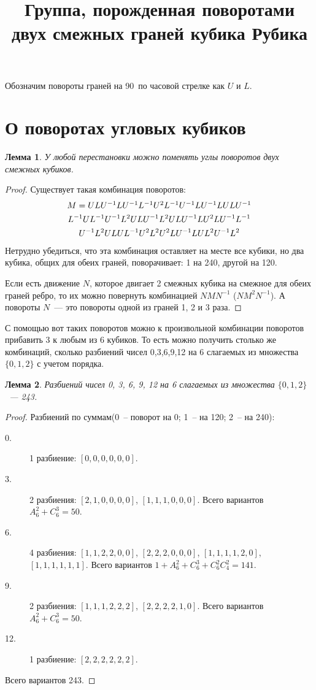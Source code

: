 \documentclass[utf8,a4paper,draft]{article}
\title{Группа, порожденная поворотами двух смежных граней кубика Рубика}
\author{}
\date{}
\newtheorem{lemma_cub1}{Лемма}
\begin{document}
\maketitle
Обозначим повороты граней на 90\textdegree~по часовой стрелке как $U$ и $L$.
\section{О поворотах угловых кубиков}
\begin{lemma_cub1}
У любой перестановки можно поменять углы поворотов двух смежных кубиков.
\end{lemma_cub1}
\begin{proof}
Существует такая комбинация поворотов:
\begin{multline*}
$$
M = ULU^{-1}LU^{-1}L^{-1}U^2L^{-1}U^{-1}LU^{-1}LULU^{-1}       \\
    L^{-1}UL^{-1}U^{-1}L^2ULU^{-1}L^2ULU^{-1}LU^2LU^{-1}L^{-1} \\
    U^{-1}L^2ULUL^{-1}U^2L^2U^2LU^{-1}LUL^2U^{-1}L^2
$$
\end{multline*}
    Нетрудно убедиться, что эта комбинация оставляет на месте все кубики, но
два кубика, общих для обеих граней, поворачивает: 1 на 240\textdegree, другой
на 120\textdegree.

    Если есть движение $N$, которое двигает 2 смежных кубика на смежное для обеих граней ребро,
то их можно повернуть комбинацией $NMN^{-1}$ ($NM^2N^{-1}$).
    А повороты $N$~--- это повороты одной из граней 1, 2 и 3 раза.
\end{proof}
С помощью вот таких поворотов можно к произвольной комбинации поворотов
прибавить 3 к любым из 6 кубиков. То есть можно получить столько же комбинаций,
сколько разбиений чисел 0,3,6,9,12 на 6 слагаемых из множества $\{0,1,2\}$ с
учетом порядка.
\begin{lemma_cub1}
    Разбиений чисел 0, 3, 6, 9, 12 на 6 слагаемых из множества $\{0,1,2\}$~--- 243.
\end{lemma_cub1}
\begin{proof}
    Разбиений по суммам(0~-- поворот на 0\textdegree; 1~-- на 120\textdegree; 2~-- на 240\textdegree):
    \begin{description}
    \item[0.] 1 разбиение: $[0,0,0,0,0,0]$.
    \item[3.] 2 разбиения: $[2,1,0,0,0,0]$, $[1,1,1,0,0,0]$. Всего вариантов
        $A^2_6+C^3_6=50$.
    \item[6.] 4 разбиения: $[1,1,2,2,0,0]$, $[2,2,2,0,0,0]$, $[1,1,1,1,2,0]$,
        $[1,1,1,1,1,1]$. Всего вариантов $1+A^2_6+C^3_6+C^2_6C^2_4=141$.
    \item[9.] 2 разбиения: $[1,1,1,2,2,2]$, $[2,2,2,2,1,0]$. Всего вариантов
        $A^2_6+C^3_6=50$.
    \item[12.]1 разбиение: $[2,2,2,2,2,2]$.
    \end{description}
    Всего вариантов 243.
\end{proof}
\end{document}
